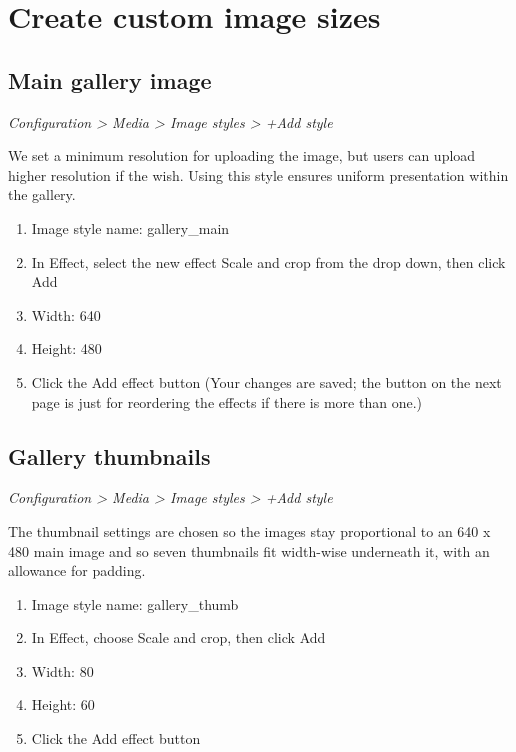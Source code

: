 \documentclass[letterpaper,10pt,english]{sphinxmanual}
\begin{document}
\chapter{Create custom image sizes}
\label{slideshows:create-custom-image-sizes}

\section{Main gallery image}
\label{slideshows:main-gallery-image}
\emph{Configuration \textgreater{} Media \textgreater{} Image styles \textgreater{} +Add style}

We set a minimum resolution for uploading the image, but users can upload higher resolution if the wish. Using this style ensures uniform presentation within the gallery.
\begin{enumerate}
\item {} 
Image style name: gallery\_main

\item {} 
In Effect, select the new effect Scale and crop from the drop down, then click Add

\item {} 
Width: 640

\item {} 
Height: 480

\item {} 
Click the Add effect button (Your changes are saved; the button on the next page is just for reordering the effects if there is more than one.)

\end{enumerate}


\section{Gallery thumbnails}
\label{slideshows:gallery-thumbnails}
\emph{Configuration \textgreater{} Media \textgreater{} Image styles \textgreater{} +Add style}

The thumbnail settings are chosen so the images stay proportional to an 640 x 480 main image and so seven thumbnails fit width-wise underneath it, with an allowance for padding.
\begin{enumerate}
\item {} 
Image style name: gallery\_thumb

\item {} 
In Effect, choose Scale and crop, then click Add

\item {} 
Width: 80

\item {} 
Height: 60

\item {} 
Click the Add effect button

\end{enumerate}
\end{document}
